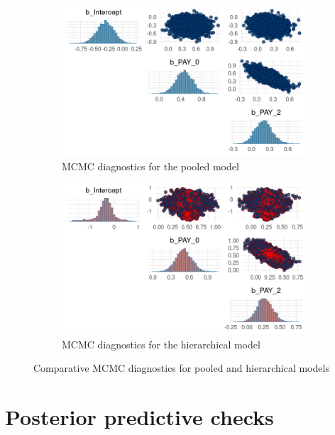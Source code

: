 \documentclass[a4paper]{artikel3}
\begin{document}
\begin{figure}[htbp]
  \centering
  \begin{subfigure}[b]{0.48\textwidth}
    \includegraphics[width=\textwidth]{mcmc_pooled.png}
    \caption{MCMC diagnostics for the pooled model}
    \label{fig:mcmc_pooled}
  \end{subfigure}
  \hfill %
  \begin{subfigure}[b]{0.48\textwidth}
    \includegraphics[width=\textwidth]{mcmc_hier.png}
    \caption{MCMC diagnostics for the hierarchical model}
    \label{fig:mcmc_hier}
  \end{subfigure}
  \caption{Comparative MCMC diagnostics for pooled and hierarchical models}
  \label{fig:mcmc_models}
\end{figure}



\section{Posterior predictive checks}
\end{document}
